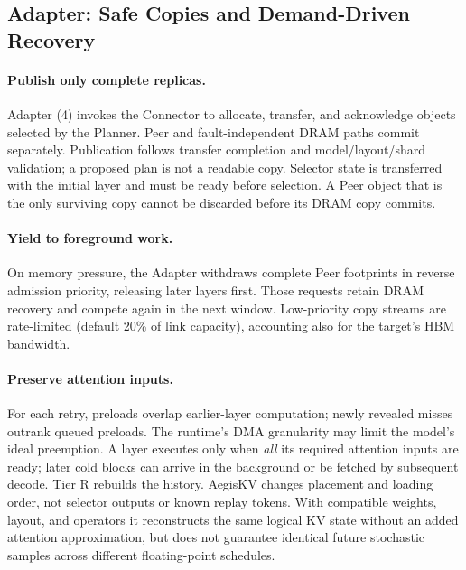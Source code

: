 \subsection{Adapter: Safe Copies and Demand-Driven Recovery}
\label{sec:kv-runtime}

\paragraph{Publish only complete replicas.}
Adapter (4) invokes the Connector to allocate, transfer, and acknowledge
objects selected by the Planner. Peer and fault-independent DRAM paths
commit separately. Publication follows transfer completion and
model/layout/shard validation; a proposed plan is not a readable copy.
Selector state is transferred with the initial layer and must be ready
before selection. A Peer object that is the only surviving copy cannot
be discarded before its DRAM copy commits.

\paragraph{Yield to foreground work.}
On memory pressure, the Adapter withdraws complete Peer footprints in
reverse admission priority, releasing later layers first. Those requests
retain DRAM recovery and compete again in the next window.
Low-priority copy streams are rate-limited (default 20\% of link
capacity), accounting also for the target's HBM bandwidth.

\paragraph{Preserve attention inputs.}
For each retry, preloads overlap earlier-layer computation; newly
revealed misses outrank queued preloads. The runtime's DMA granularity
may limit the model's ideal preemption. A layer executes only when
\emph{all} its required attention inputs are ready; later cold blocks
can arrive in the background or be fetched by subsequent decode.
Tier R rebuilds the history. AegisKV changes placement and loading order,
not selector outputs or known replay tokens. With compatible weights,
layout, and operators it reconstructs the same logical KV state without
an added attention approximation, but does not guarantee identical
future stochastic samples across different floating-point schedules.
